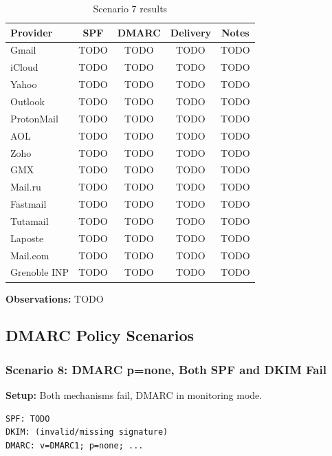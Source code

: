\documentclass[11pt,a4paper]{article}
\begin{document}
\begin{table}[h]
\centering
\small
\begin{tabular}{lcccc}
\toprule
\textbf{Provider} & \textbf{SPF} & \textbf{DMARC} & \textbf{Delivery} & \textbf{Notes} \\
\midrule
Gmail & TODO & TODO & TODO & TODO \\
iCloud & TODO & TODO & TODO & TODO \\
Yahoo & TODO & TODO & TODO & TODO \\
Outlook & TODO & TODO & TODO & TODO \\
ProtonMail & TODO & TODO & TODO & TODO \\
AOL & TODO & TODO & TODO & TODO \\
Zoho & TODO & TODO & TODO & TODO \\
GMX & TODO & TODO & TODO & TODO \\
Mail.ru & TODO & TODO & TODO & TODO \\
Fastmail & TODO & TODO & TODO & TODO \\
Tutamail & TODO & TODO & TODO & TODO \\
Laposte & TODO & TODO & TODO & TODO \\
Mail.com & TODO & TODO & TODO & TODO \\
Grenoble INP & TODO & TODO & TODO & TODO \\
\bottomrule
\end{tabular}
\caption{Scenario 7 results}
\end{table}

\textbf{Observations:} TODO

\subsection{DMARC Policy Scenarios}

\subsubsection{Scenario 8: DMARC p=none, Both SPF and DKIM Fail}

\textbf{Setup:} Both mechanisms fail, DMARC in monitoring mode.

\begin{lstlisting}
SPF: TODO
DKIM: (invalid/missing signature)
DMARC: v=DMARC1; p=none; ...
\end{lstlisting}
\end{document}

